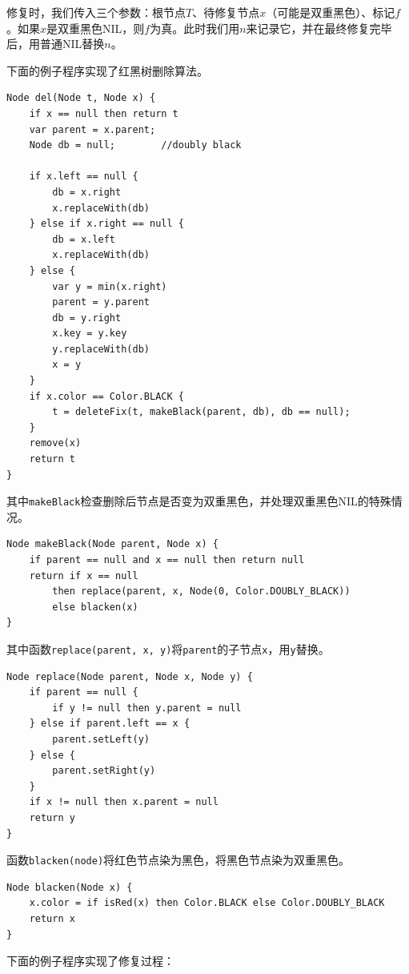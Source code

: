 \documentclass[b5paper]{ctexart}
\begin{document}
修复时，我们传入三个参数：根节点$T$、待修复节点$x$（可能是双重黑色）、标记$f$。如果$x$是双重黑色NIL，则$f$为真。此时我们用$n$来记录它，并在最终修复完毕后，用普通NIL替换$n$。

下面的例子程序实现了红黑树删除算法。

\begin{lstlisting}[language = Bourbaki]
Node del(Node t, Node x) {
    if x == null then return t
    var parent = x.parent;
    Node db = null;        //doubly black

    if x.left == null {
        db = x.right
        x.replaceWith(db)
    } else if x.right == null {
        db = x.left
        x.replaceWith(db)
    } else {
        var y = min(x.right)
        parent = y.parent
        db = y.right
        x.key = y.key
        y.replaceWith(db)
        x = y
    }
    if x.color == Color.BLACK {
        t = deleteFix(t, makeBlack(parent, db), db == null);
    }
    remove(x)
    return t
}
\end{lstlisting}

其中\texttt{makeBlack}检查删除后节点是否变为双重黑色，并处理双重黑色NIL的特殊情况。

\begin{lstlisting}[language = Bourbaki]
Node makeBlack(Node parent, Node x) {
    if parent == null and x == null then return null
    return if x == null
        then replace(parent, x, Node(0, Color.DOUBLY_BLACK))
        else blacken(x)
}
\end{lstlisting}

其中函数\texttt{replace(parent, x, y)}将\texttt{parent}的子节点\texttt{x}，用\texttt{y}替换。

\begin{lstlisting}[language = Bourbaki]
Node replace(Node parent, Node x, Node y) {
    if parent == null {
        if y != null then y.parent = null
    } else if parent.left == x {
        parent.setLeft(y)
    } else {
        parent.setRight(y)
    }
    if x != null then x.parent = null
    return y
}
\end{lstlisting}

函数\texttt{blacken(node)}将红色节点染为黑色，将黑色节点染为双重黑色。

\begin{lstlisting}[language = Bourbaki]
Node blacken(Node x) {
    x.color = if isRed(x) then Color.BLACK else Color.DOUBLY_BLACK
    return x
}
\end{lstlisting}

下面的例子程序实现了修复过程：
\end{document}
